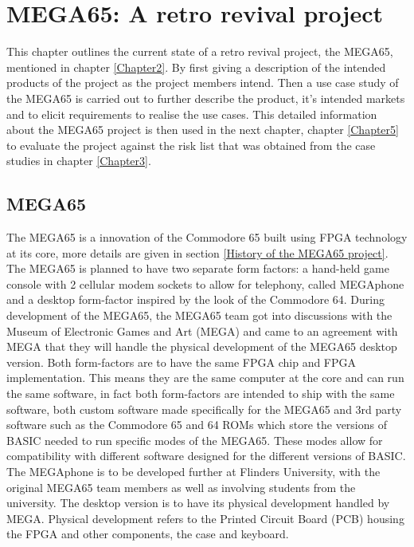 
\chapter{MEGA65: A retro revival project}
\label{Chapter4}

This chapter outlines the current state of a retro revival project, the MEGA65, mentioned in chapter \ref{Chapter2}. By first giving a description of the intended products of the project as the project members intend. Then a use case study of the MEGA65 is carried out to further describe the product, it's intended markets and to elicit requirements to realise the use cases. This detailed information about the MEGA65 project is then used in the next chapter, chapter \ref{Chapter5} to evaluate the project against the risk list that was obtained from the case studies in chapter \ref{Chapter3}.
\section{MEGA65}
The MEGA65 is a innovation of the Commodore 65 built using FPGA technology at its core, more details are given in section \ref{History of the MEGA65 project}. The MEGA65 is planned to have two separate form factors: a hand-held game console with 2 cellular modem sockets to allow for telephony, called MEGAphone and a desktop form-factor inspired by the look of the Commodore 64. During development of the MEGA65, the MEGA65 team got into discussions with the Museum of Electronic Games and Art (MEGA) and came to an agreement with MEGA that they will handle the physical development of the MEGA65 desktop version. Both form-factors are to have the same FPGA chip and FPGA implementation. This means they are the same computer at the core and can run the same software, in fact both form-factors are intended to ship with the same software, both custom software made specifically for the MEGA65 and 3rd party software such as the Commodore 65 and 64 ROMs which store the versions of BASIC needed to run specific modes of the MEGA65. These modes allow for compatibility with different software designed for the different versions of BASIC. The MEGAphone is to be developed further at Flinders University, with the original MEGA65 team members as well as involving students from the university. The desktop version is to have its physical development handled by MEGA. Physical development refers to the Printed Circuit Board (PCB) housing the FPGA and other components, the case and keyboard. 

